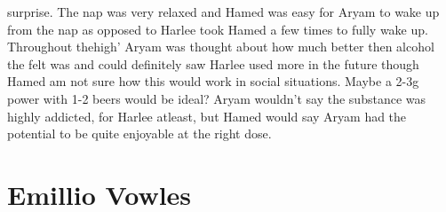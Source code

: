 \documentclass[12pt]{book}
\begin{document}
surprise. The nap was very relaxed and Hamed was easy for Aryam to wake up from the nap as opposed to Harlee took Hamed a few times to fully wake up. Throughout thehigh' Aryam was thought about how much better then alcohol the felt was and could definitely saw Harlee used more in the future though Hamed am not sure how this would work in social situations. Maybe a 2-3g power with 1-2 beers would be ideal? Aryam wouldn't say the substance was highly addicted, for Harlee atleast, but Hamed would say Aryam had the potential to be quite enjoyable at the right dose.






\chapter{Emillio Vowles}
\end{document}
